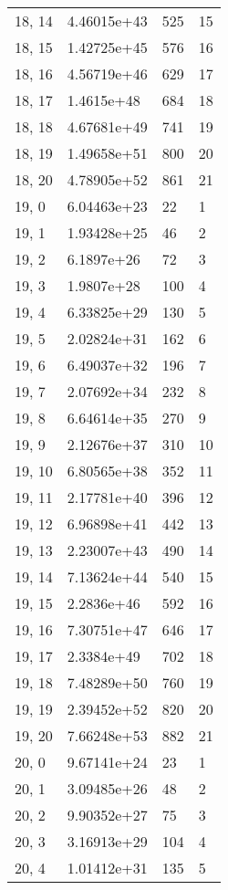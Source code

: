 \begin{table}
\begin{tabular}{llll}
18, 14 &  4.46015e+43 &  525 &    15 \\
18, 15 &  1.42725e+45 &  576 &    16 \\
18, 16 &  4.56719e+46 &  629 &    17 \\
18, 17 &   1.4615e+48 &  684 &    18 \\
18, 18 &  4.67681e+49 &  741 &    19 \\
18, 19 &  1.49658e+51 &  800 &    20 \\
18, 20 &  4.78905e+52 &  861 &    21 \\
19, 0  &  6.04463e+23 &   22 &     1 \\
19, 1  &  1.93428e+25 &   46 &     2 \\
19, 2  &   6.1897e+26 &   72 &     3 \\
19, 3  &   1.9807e+28 &  100 &     4 \\
19, 4  &  6.33825e+29 &  130 &     5 \\
19, 5  &  2.02824e+31 &  162 &     6 \\
19, 6  &  6.49037e+32 &  196 &     7 \\
19, 7  &  2.07692e+34 &  232 &     8 \\
19, 8  &  6.64614e+35 &  270 &     9 \\
19, 9  &  2.12676e+37 &  310 &    10 \\
19, 10 &  6.80565e+38 &  352 &    11 \\
19, 11 &  2.17781e+40 &  396 &    12 \\
19, 12 &  6.96898e+41 &  442 &    13 \\
19, 13 &  2.23007e+43 &  490 &    14 \\
19, 14 &  7.13624e+44 &  540 &    15 \\
19, 15 &   2.2836e+46 &  592 &    16 \\
19, 16 &  7.30751e+47 &  646 &    17 \\
19, 17 &   2.3384e+49 &  702 &    18 \\
19, 18 &  7.48289e+50 &  760 &    19 \\
19, 19 &  2.39452e+52 &  820 &    20 \\
19, 20 &  7.66248e+53 &  882 &    21 \\
20, 0  &  9.67141e+24 &   23 &     1 \\
20, 1  &  3.09485e+26 &   48 &     2 \\
20, 2  &  9.90352e+27 &   75 &     3 \\
20, 3  &  3.16913e+29 &  104 &     4 \\
20, 4  &  1.01412e+31 &  135 &     5 \\

\end{tabular}
\end{table}
